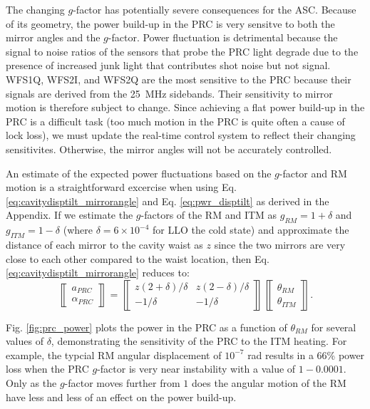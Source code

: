 The changing $g$-factor has potentially severe consequences for the
ASC. Because of its geometry, the power build-up in the PRC is very
sensitve to both the mirror angles and the $g$-factor. Power
fluctuation is detrimental because the signal to noise ratios of the
sensors that probe the PRC light degrade due to the presence of
increased junk light that contributes shot noise but not
signal. WFS1Q, WFS2I, and WFS2Q are the most sensitive to the PRC
because their signals are derived from the 25~MHz sidebands. Their
sensitivity to mirror motion is therefore subject to change. Since
achieving a flat power build-up in the PRC is a difficult task (too
much motion in the PRC is quite often a cause of lock loss), we must
update the real-time control system to reflect their changing
sensitivites. Otherwise, the mirror angles will not be accurately
controlled.

An estimate of the expected power fluctuations based on the $g$-factor
and RM motion is a straightforward excercise when using
Eq. \ref{eq:cavitydisptilt_mirrorangle} and Eq. \ref{eq:pwr_disptilt}
as derived in the Appendix. If we estimate the $g$-factors of the RM
and ITM as $g_{RM} = 1+\delta$ and $g_{ITM} = 1 - \delta$ (where
$\delta =6 \times 10^{-4}$ for LLO the cold state) and approximate the
distance of each mirror to the cavity waist as $z$ since the two
mirrors are very close to each other compared to the waist location,
then Eq. \ref{eq:cavitydisptilt_mirrorangle} reduces to:
\begin{equation}
\left\llbracket \begin{array}{c}
a_{PRC} \\
\alpha_{PRC} \end{array} \right\rrbracket = 
\left\llbracket \begin{array}{cc}
z(2+\delta)/\delta & z(2-\delta)/\delta \\
-1/\delta & -1/\delta \end{array} \right\rrbracket
\left\llbracket \begin{array}{c}
\theta_{RM}\\
\theta_{ITM} \end{array} \right\rrbracket.
\end{equation}

Fig. \ref{fig:prc_power} plots the power in the PRC as a function of
$\theta_{RM}$ for several values of $\delta$, demonstrating
the sensitivity of the PRC to the ITM heating.  For example, the
typcial RM angular displacement of $10^{-7}$ rad results in a 66\%
power loss when the PRC $g$-factor is very near instability with a
value of $1-0.0001$. Only as the $g$-factor moves further from $1$
does the angular motion of the RM have less and less of an effect on
the power build-up.

